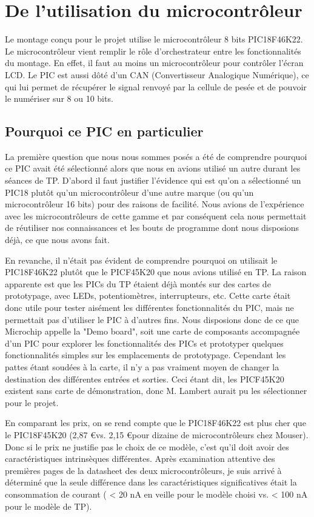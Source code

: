\documentclass[a4paper,11pt,titlepage]{article}
\begin{document}
\section{De l'utilisation du microcontrôleur}
Le montage conçu pour le projet utilise le microcontrôleur 8 bits PIC18F46K22.
Le microcontrôleur vient remplir le rôle d'orchestrateur entre les fonctionnalités du montage. En effet, il faut au moins un microcontrôleur pour contrôler l'écran LCD. Le PIC est aussi dôté d'un CAN (Convertisseur Analogique Numérique), ce qui lui permet de récupérer le signal renvoyé par la cellule de pesée et de pouvoir le numériser sur 8 ou 10 bits.
\subsection{Pourquoi ce PIC en particulier}
La première question que nous nous sommes posés a été de comprendre pourquoi ce PIC avait été sélectionné alors que nous en avions utilisé un autre durant les séances de TP.
D'abord il faut justifier l'évidence qui est qu'on a sélectionné un PIC18 plutôt qu'un microcontrôleur d'une autre marque (ou qu'un microcontrôleur 16 bits) pour des raisons de facilité. Nous avions de l'expérience avec les microcontrôleurs de cette gamme et par conséquent cela nous permettait de réutiliser nos connaissances et les bouts de programme dont nous disposions déjà, ce que nous avons fait.

En revanche, il n'était pas évident de comprendre pourquoi on utilisait le PIC18F46K22 plutôt que le PICF45K20 que nous avions utilisé en TP. La raison apparente est que les PICs du TP étaient déjà montés sur des cartes de prototypage, avec LEDs, potentiomètres, interrupteurs, etc. Cette carte était donc utile pour tester aisément les différentes fonctionnalités du PIC, mais ne permettait pas d'utiliser le PIC à d'autres fins. Nous disposions donc de ce que Microchip appelle la "Demo board", soit une carte de composants accompagnée d'un PIC pour explorer les fonctionnalités des PICs et prototyper quelques fonctionnalités simples sur les emplacements de prototypage. Cependant les pattes étant soudées à la carte, il n'y a pas vraiment moyen de changer la destination des différentes entrées et sorties.
Ceci étant dit, les PICF45K20 existent sans carte de démonstration, donc M. Lambert aurait pu les sélectionner pour le projet.

En comparant les prix, on se rend compte que le PIC18F46K22 est plus cher que le PIC18F45K20 (2,87 \euro  vs. 2,15 \euro  pour dizaine de microcontrôleurs chez Mouser). Donc si le prix ne justifie pas le choix de ce modèle, c'est qu'il doit avoir des caractéristiques intrinsèques différentes. Après examination attentive des premières pages de la datasheet des deux microcontrôleurs, je suis arrivé à déterminé que la seule différence dans les caractéristiques significatives était la consommation de courant ( < 20 nA en veille pour le modèle choisi vs. < 100 nA pour le modèle de TP).
\end{document}

